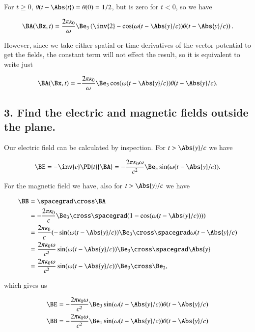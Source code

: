 For $t \ge 0$, $\theta(t - \Abs{t}) = \theta(0) = 1/2$, but is zero for $t < 0$, so we have

\begin{equation}\label{eqn:relElectroDynProblemSet5P1:170b}
\BA(\Bx, t) 
= \frac{ 2 \pi \kappa_0 }{\omega} \Be_3 \left( \inv{2} - \cos(\omega(t - \Abs{y}/c)) \theta(t - \Abs{y}/c) \right).
\end{equation}

However, since we take either spatial or time derivatives of the vector potential to get the fields, the constant term will not effect the result, so it is equivalent to write just

\begin{equation}\label{eqn:relElectroDynProblemSet5P1:170}
\BA(\Bx, t) 
= -\frac{ 2 \pi \kappa_0 }{\omega} \Be_3 \cos(\omega(t - \Abs{y}/c)) \theta(t - \Abs{y}/c).
\end{equation}

\subsection{3. Find the electric and magnetic fields outside the plane.}

Our electric field can be calculated by inspection.  For $t > \Abs{y}/c$ we have

\begin{equation}\label{eqn:relElectroDynProblemSet5P1:190}
\BE = -\inv{c}\PD{t}{\BA} 
= -\frac{
2 \pi \kappa_0 \omega
}{c^2} \Be_3 \sin(\omega(t - \Abs{y}/c)).
\end{equation}

For the magnetic field we have, also for $t > \Abs{y}/c$ we have

\begin{align*}
\BB 
&= \spacegrad \cross \BA \\
&= -\frac{ 2 \pi \kappa_0 }{c} \Be_3 \cross \spacegrad (1 -\cos(\omega(t - \Abs{y}/c)))) \\
&= \frac{
2 \pi \kappa_0 
}{c} 
(-\sin(\omega(t - \Abs{y}/c))
\Be_3 \cross \spacegrad \omega(t - \Abs{y}/c) \\
&= \frac{
2 \pi \kappa_0 \omega
}{c^2} 
\sin(\omega(t - \Abs{y}/c))
\Be_3 \cross 
 \spacegrad \Abs{y} \\
&= \frac{
2 \pi \kappa_0 \omega
}{c^2} 
\sin(\omega(t - \Abs{y}/c)) 
\Be_3 \cross \Be_2,
\end{align*}

which gives us

\begin{align}\label{eqn:relElectroDynProblemSet5P1:210}
\BE &= -\frac{ 2 \pi \kappa_0 \omega }{c^2} \Be_3 \sin(\omega(t - \Abs{y}/c)) \theta(t - \Abs{y}/c) \\
\BB &= -\frac{ 2 \pi \kappa_0 \omega }{c^2} \Be_1 \sin(\omega(t - \Abs{y}/c)) \theta(t - \Abs{y}/c)
\end{align}

